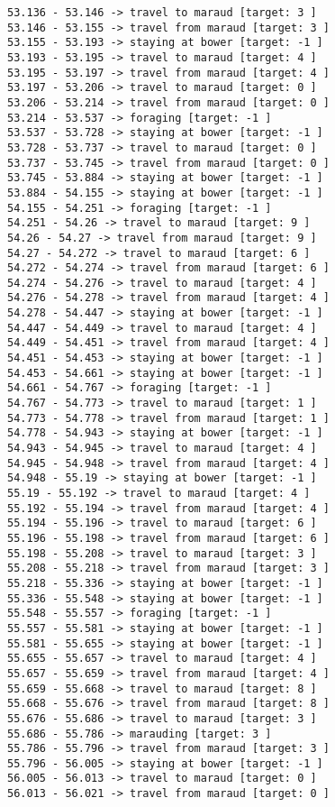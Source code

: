 \documentclass[11pt]{article}
\begin{document}
\begin{Verbatim}[commandchars=\\\{\}]
53.136 - 53.146 -> travel to maraud [target: 3 ]
53.146 - 53.155 -> travel from maraud [target: 3 ]
53.155 - 53.193 -> staying at bower [target: -1 ]
53.193 - 53.195 -> travel to maraud [target: 4 ]
53.195 - 53.197 -> travel from maraud [target: 4 ]
53.197 - 53.206 -> travel to maraud [target: 0 ]
53.206 - 53.214 -> travel from maraud [target: 0 ]
53.214 - 53.537 -> foraging [target: -1 ]
53.537 - 53.728 -> staying at bower [target: -1 ]
53.728 - 53.737 -> travel to maraud [target: 0 ]
53.737 - 53.745 -> travel from maraud [target: 0 ]
53.745 - 53.884 -> staying at bower [target: -1 ]
53.884 - 54.155 -> staying at bower [target: -1 ]
54.155 - 54.251 -> foraging [target: -1 ]
54.251 - 54.26 -> travel to maraud [target: 9 ]
54.26 - 54.27 -> travel from maraud [target: 9 ]
54.27 - 54.272 -> travel to maraud [target: 6 ]
54.272 - 54.274 -> travel from maraud [target: 6 ]
54.274 - 54.276 -> travel to maraud [target: 4 ]
54.276 - 54.278 -> travel from maraud [target: 4 ]
54.278 - 54.447 -> staying at bower [target: -1 ]
54.447 - 54.449 -> travel to maraud [target: 4 ]
54.449 - 54.451 -> travel from maraud [target: 4 ]
54.451 - 54.453 -> staying at bower [target: -1 ]
54.453 - 54.661 -> staying at bower [target: -1 ]
54.661 - 54.767 -> foraging [target: -1 ]
54.767 - 54.773 -> travel to maraud [target: 1 ]
54.773 - 54.778 -> travel from maraud [target: 1 ]
54.778 - 54.943 -> staying at bower [target: -1 ]
54.943 - 54.945 -> travel to maraud [target: 4 ]
54.945 - 54.948 -> travel from maraud [target: 4 ]
54.948 - 55.19 -> staying at bower [target: -1 ]
55.19 - 55.192 -> travel to maraud [target: 4 ]
55.192 - 55.194 -> travel from maraud [target: 4 ]
55.194 - 55.196 -> travel to maraud [target: 6 ]
55.196 - 55.198 -> travel from maraud [target: 6 ]
55.198 - 55.208 -> travel to maraud [target: 3 ]
55.208 - 55.218 -> travel from maraud [target: 3 ]
55.218 - 55.336 -> staying at bower [target: -1 ]
55.336 - 55.548 -> staying at bower [target: -1 ]
55.548 - 55.557 -> foraging [target: -1 ]
55.557 - 55.581 -> staying at bower [target: -1 ]
55.581 - 55.655 -> staying at bower [target: -1 ]
55.655 - 55.657 -> travel to maraud [target: 4 ]
55.657 - 55.659 -> travel from maraud [target: 4 ]
55.659 - 55.668 -> travel to maraud [target: 8 ]
55.668 - 55.676 -> travel from maraud [target: 8 ]
55.676 - 55.686 -> travel to maraud [target: 3 ]
55.686 - 55.786 -> marauding [target: 3 ]
55.786 - 55.796 -> travel from maraud [target: 3 ]
55.796 - 56.005 -> staying at bower [target: -1 ]
56.005 - 56.013 -> travel to maraud [target: 0 ]
56.013 - 56.021 -> travel from maraud [target: 0 ]

\end{Verbatim}
\end{document}

